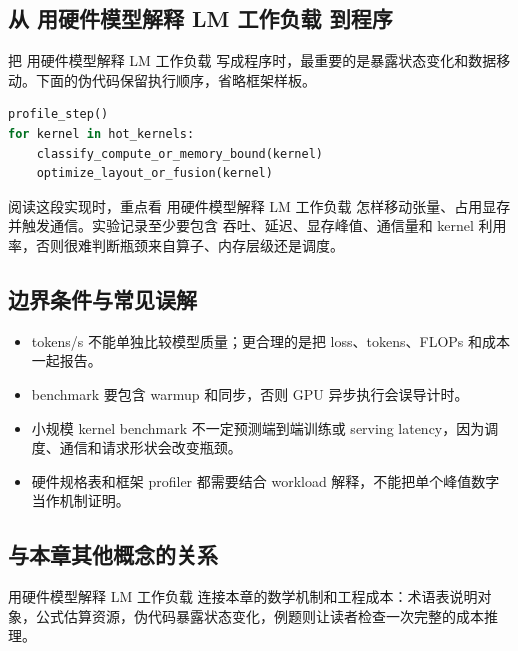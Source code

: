 \documentclass[a4paper]{article}
\begin{document}
\subsection{从 用硬件模型解释 LM 工作负载 到程序}
把 用硬件模型解释 LM 工作负载 写成程序时，最重要的是暴露状态变化和数据移动。下面的伪代码保留执行顺序，省略框架样板。
\begin{lstlisting}[language=Python]
profile_step()
for kernel in hot_kernels:
    classify_compute_or_memory_bound(kernel)
    optimize_layout_or_fusion(kernel)
\end{lstlisting}
阅读这段实现时，重点看 用硬件模型解释 LM 工作负载 怎样移动张量、占用显存并触发通信。实验记录至少要包含 吞吐、延迟、显存峰值、通信量和 kernel 利用率，否则很难判断瓶颈来自算子、内存层级还是调度。
\subsection{边界条件与常见误解}
\begin{itemize}
\item tokens/s 不能单独比较模型质量；更合理的是把 loss、tokens、FLOPs 和成本一起报告。
\item benchmark 要包含 warmup 和同步，否则 GPU 异步执行会误导计时。
\item 小规模 kernel benchmark 不一定预测端到端训练或 serving latency，因为调度、通信和请求形状会改变瓶颈。
\item 硬件规格表和框架 profiler 都需要结合 workload 解释，不能把单个峰值数字当作机制证明。
\end{itemize}
\subsection{与本章其他概念的关系}
用硬件模型解释 LM 工作负载 连接本章的数学机制和工程成本：术语表说明对象，公式估算资源，伪代码暴露状态变化，例题则让读者检查一次完整的成本推理。
\end{document}
